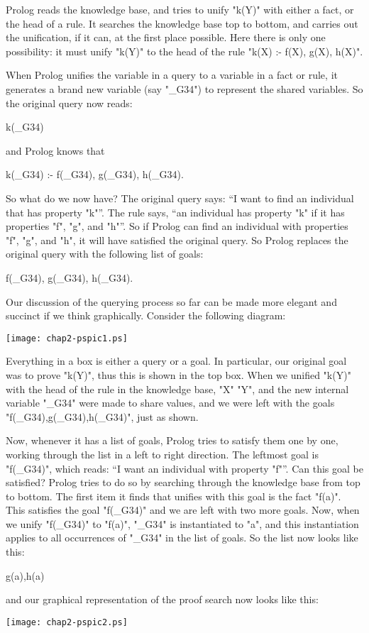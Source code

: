 Prolog reads the knowledge base, and tries to unify "k(Y)" with either
a fact, or the head of a rule. It searches the knowledge base top to
bottom, and carries out the unification, if it can, at the first place
possible. Here there is only one possibility: it must unify "k(Y)" to
the head of the rule "k(X) :- f(X), g(X), h(X)".

When Prolog unifies the variable in a query to a variable in a fact or
rule, it generates a brand new variable
(say "_G34")
to represent the shared
variables. So the original query now reads:
\begin{LPNcodedisplay}
k(_G34)
\end{LPNcodedisplay}
%
and Prolog knows that
\begin{LPNcodedisplay}
k(_G34) :- f(_G34), g(_G34), h(_G34).
\end{LPNcodedisplay}


So what do we now have? The original query says: ``I want to find an
individual that has property "k"''. The rule says, ``an individual has
property "k" if it has properties "f", "g", and "h"''. So if Prolog
can find an individual with properties "f", "g", and "h", it will have
satisfied the original query. So Prolog replaces the original query
with the following list of goals:
\begin{LPNcodedisplay}
f(_G34), g(_G34), h(_G34).
\end{LPNcodedisplay}

Our discussion of the querying process so far can be made more elegant
and succinct if we think graphically. Consider the following diagram:
%
\begin{center}
\texttt{[image: chap2-pspic1.ps]}
\end{center}
%
Everything in a box is either a query or a goal.  In particular, our
original goal was to prove "k(Y)", thus this is shown in the top box.
When we unified "k(Y)" with the head of the rule in the knowledge
base, "X" "Y", and the new internal variable "_G34" were made to share
values, and we were left with the goals "f(_G34),g(_G34),h(_G34)",
just as shown.

Now, whenever it has a list of goals, Prolog tries to satisfy them one
by one, working through the list in a left to right direction. The
leftmost goal is "f(_G34)", which reads: ``I want an individual with
property "f"''. Can this goal be satisfied? Prolog tries to do so by
searching through the knowledge base from top to bottom.  The first
item it finds that unifies with this goal is the fact "f(a)". This
satisfies the goal "f(_G34)" and we are left with two more goals.
Now, when we unify "f(_G34)" to "f(a)", "_G34" is instantiated to "a",
and this instantiation applies to all occurrences of "_G34" in the
list of goals. So the list now looks like this:
\begin{LPNcodedisplay}
g(a),h(a)
\end{LPNcodedisplay}
%
and our graphical representation of the proof search now looks like this:
%
\begin{center}
\texttt{[image: chap2-pspic2.ps]}
\end{center}
%


